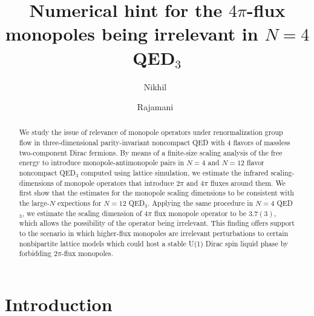 \documentclass[prd, onecolumn, superscriptaddress, nofootinbib, notitlepage, floatfix]{revtex4-1}
\begin{document}
\widetext

\title{Numerical hint for the $4\pi$-flux monopoles being irrelevant in $N=4$ QED$_3$}

\author{Nikhil\ }
\author{Rajamani\ }



\begin{abstract}

We study the issue of relevance of monopole operators under
renormalization group flow in three-dimensional parity-invariant
noncompact QED with 4 flavors of massless two-component Dirac
fermions.  By means of a finite-size scaling analysis of the free
energy to introduce monopole-antimonopole pairs in  $N=4$ and $N=12$
flavor noncompact QED$_3$ computed using lattice simulation, we
estimate the infrared scaling-dimensions of monopole operators that
introduce $2\pi$ and $4\pi$ fluxes around them.  We first show that
the estimates for the monopole scaling dimensions to be consistent
with the large-$N$ expections for $N=12$ QED$_3$. Applying the same
procedure in $N=4$ QED$_3$, we estimate the scaling dimension of
$4\pi$ flux monopole operator to be $3.7(3)$, which allows the
possibility of the operator being irrelevant.  This finding offers
support to the scenario in which higher-flux monopoles are irrelevant
perturbations to certain nonbipartite lattice models which could
host a stable U(1) Dirac spin liquid phase by forbidding $2\pi$-flux
monopoles.

\end{abstract}

\maketitle

\section{Introduction}\label{sec:intro}
\end{document}
